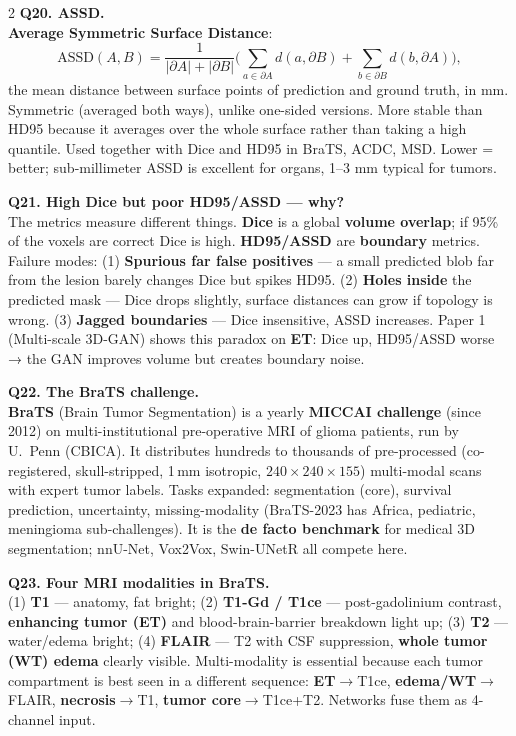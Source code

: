 \begin{paracol}{2}
\textbf{Q20. ASSD.}\\
\textbf{Average Symmetric Surface Distance}:
\[\text{ASSD}(A,B)=\frac{1}{|\partial A|+|\partial B|}\Big(\sum_{a\in\partial A}d(a,\partial B)+\sum_{b\in\partial B}d(b,\partial A)\Big),\]
the mean distance between surface points of prediction and ground truth, in mm. Symmetric (averaged both ways), unlike one-sided versions. More stable than HD95 because it averages over the whole surface rather than taking a high quantile. Used together with Dice and HD95 in BraTS, ACDC, MSD. Lower = better; sub-millimeter ASSD is excellent for organs, 1--3 mm typical for tumors.

\textbf{Q21. High Dice but poor HD95/ASSD — why?}\\
The metrics measure different things. \textbf{Dice} is a global \textbf{volume overlap}; if 95\% of the voxels are correct Dice is high. \textbf{HD95/ASSD} are \textbf{boundary} metrics. Failure modes: (1) \textbf{Spurious far false positives} — a small predicted blob far from the lesion barely changes Dice but spikes HD95. (2) \textbf{Holes inside} the predicted mask — Dice drops slightly, surface distances can grow if topology is wrong. (3) \textbf{Jagged boundaries} — Dice insensitive, ASSD increases. Paper 1 (Multi-scale 3D-GAN) shows this paradox on \textbf{ET}: Dice up, HD95/ASSD worse → the GAN improves volume but creates boundary noise.

\textbf{Q22. The BraTS challenge.}\\
\textbf{BraTS} (Brain Tumor Segmentation) is a yearly \textbf{MICCAI challenge} (since 2012) on multi-institutional pre-operative MRI of glioma patients, run by U.~Penn (CBICA). It distributes hundreds to thousands of pre-processed (co-registered, skull-stripped, 1\,mm isotropic, $240\!\times\!240\!\times\!155$) multi-modal scans with expert tumor labels. Tasks expanded: segmentation (core), survival prediction, uncertainty, missing-modality (BraTS-2023 has Africa, pediatric, meningioma sub-challenges). It is the \textbf{de facto benchmark} for medical 3D segmentation; nnU-Net, Vox2Vox, Swin-UNetR all compete here.

\textbf{Q23. Four MRI modalities in BraTS.}\\
(1) \textbf{T1} — anatomy, fat bright; (2) \textbf{T1-Gd / T1ce} — post-gadolinium contrast, \textbf{enhancing tumor (ET)} and blood-brain-barrier breakdown light up; (3) \textbf{T2} — water/edema bright; (4) \textbf{FLAIR} — T2 with CSF suppression, \textbf{whole tumor (WT) edema} clearly visible. Multi-modality is essential because each tumor compartment is best seen in a different sequence: \textbf{ET}$\to$T1ce, \textbf{edema/WT}$\to$FLAIR, \textbf{necrosis}$\to$T1, \textbf{tumor core}$\to$T1ce+T2. Networks fuse them as 4-channel input.


\end{paracol}
